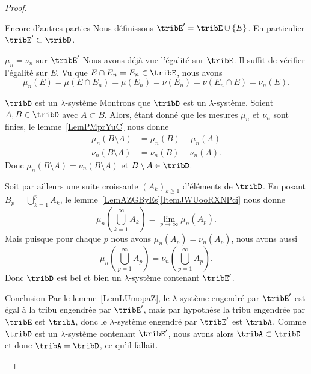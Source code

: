 \begin{proof}
\begin{subproof}
		\item[Encore d'autres parties]
		Nous définissons \( \tribE'=\tribE\cup\{ E \}\). En particulier \( \tribE'\subset\tribD\).

		\item[\( \mu_n=\nu_n\) sur \( \tribE'\)]
		Nous avons déjà vue l'égalité sur \( \tribE\). Il suffit de vérifier l'égalité sur \( E\). Vu que \( E\cap E_n=E_n\in\tribE\), nous avons
		\begin{equation}
			\mu_n(E)=\mu(E\cap E_n)=\mu(E_n)=\nu(E_n)=\nu(E_n\cap E)=\nu_n(E).
		\end{equation}

		\item[\( \tribD\) est un \( \lambda\)-système]
		Montrons que \( \tribD\) est un \( \lambda\)-système. Soient \( A,B\in\tribD\) avec \( A\subset B\). Alors, étant donné que les mesures \( \mu_n\) et \( \nu_n\) sont finies, le lemme~\ref{LemPMprYuC} nous donne
		\begin{subequations}
			\begin{align}
				\mu_n(B\setminus A) & =\mu_n(B)-\mu_n(A)  \\
				\nu_n(B\setminus A) & =\nu_n(B)-\nu_n(A).
			\end{align}
		\end{subequations}
		Donc \( \mu_n(B\setminus A)=\nu_n(B\setminus A)\) et \( B\setminus A\in\tribD\).

		Soit par ailleurs une suite croissante \( (A_k)_{k\geq 1}\) d'éléments de \( \tribD\). En posant \( B_p=\bigcup_{k=1}^pA_k\), le lemme~\ref{LemAZGByEs}\ref{ItemJWUooRXNPci} nous donne
		\begin{equation}
			\mu_n(\bigcup_{k=1}^{\infty}A_k)=\lim_{p\to \infty} \mu_n(A_p).
		\end{equation}
		Mais puisque pour chaque \( p\) nous avons \( \mu_n(A_p)=\nu_n(A_p)\), nous avons aussi
		\begin{equation}
			\mu_n(\bigcup_{p=1}^{\infty}A_p)=\nu_n(\bigcup_{p=1}^{\infty}A_p).
		\end{equation}
		Donc \( \tribD\) est bel et bien un \( \lambda\)-système contenant \( \tribE'\).

		\item[Conclusion]
		Par le lemme~\ref{LemLUmopaZ}, le \( \lambda\)-système engendré par \( \tribE'\) est égal à la tribu engendrée par \( \tribE'\), mais par hypothèse la tribu engendrée par \( \tribE\) est \( \tribA\), donc le \( \lambda\)-système engendré par \( \tribE'\) est \( \tribA\). Comme \( \tribD\) est un \( \lambda\)-système contenant \( \tribE'\), nous avons alors \( \tribA\subset\tribD\) et donc \( \tribA=\tribD\), ce qu'il fallait.
	\end{subproof}
\end{proof}


